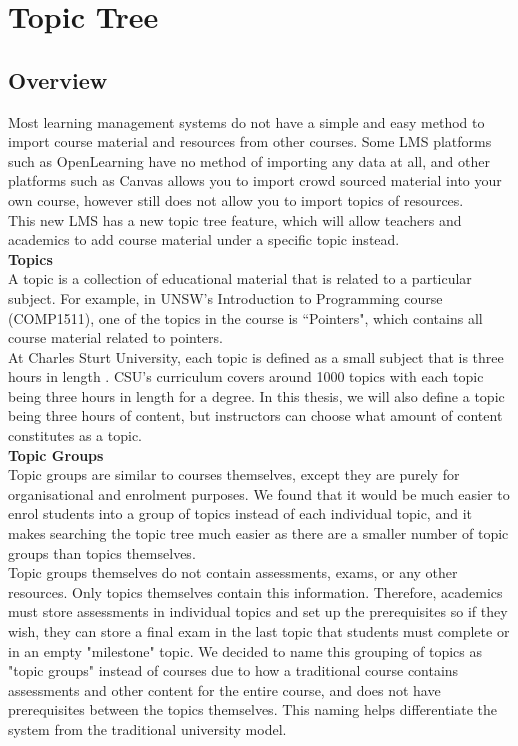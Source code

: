 \section{Topic Tree}
\subsection{Overview}
Most learning management systems do not have a simple and easy method to import course material and resources from other courses. Some LMS platforms such as OpenLearning have no method of importing any data at all, and other platforms such as Canvas allows you to import crowd sourced material into your own course, however still does not allow you to import topics of resources. \\

This new LMS has a new topic tree feature, which will allow teachers and academics to add course material under a specific topic instead.\\

\textbf{Topics} \\
A topic is a collection of educational material that is related to a particular subject. For example, in UNSW's Introduction to Programming course (COMP1511), one of the topics in the course is ``Pointers", which contains all course material related to pointers.\\

At Charles Sturt University, each topic is defined as a small subject that is three hours in length \cite{csutopictree}. CSU's curriculum covers around 1000 topics with each topic being three hours in length for a degree. In this thesis, we will also define a topic being three hours of content, but instructors can choose what amount of content constitutes as a topic.\\

\textbf{Topic Groups} \\
Topic groups are similar to courses themselves, except they are purely for organisational and enrolment purposes. We found that it would be much easier to enrol students into a group of topics instead of each individual topic, and it makes searching the topic tree much easier as there are a smaller number of topic groups than topics themselves. \\

Topic groups themselves do not contain assessments, exams, or any other resources. Only topics themselves contain this information. Therefore, academics must store assessments in individual topics and set up the prerequisites so if they wish, they can store a final exam in the last topic that students must complete or in an empty "milestone" topic. We decided to name this grouping of topics as "topic groups" instead of courses due to how a traditional course contains assessments and other content for the entire course, and does not have prerequisites between the topics themselves. This naming helps differentiate the system from the traditional university model.\\


